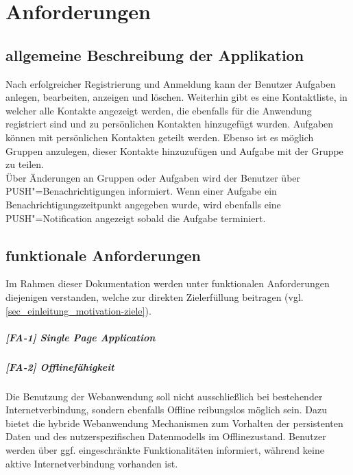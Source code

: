 \chapter{Anforderungen}
\section{allgemeine Beschreibung der Applikation}

Nach erfolgreicher Registrierung und Anmeldung kann der Benutzer Aufgaben anlegen, bearbeiten, anzeigen und löschen. Weiterhin gibt es eine Kontaktliste, in welcher alle Kontakte angezeigt werden, die ebenfalls für die Anwendung registriert sind und zu persönlichen Kontakten hinzugefügt wurden. Aufgaben können mit persönlichen Kontakten geteilt werden. Ebenso ist es möglich Gruppen anzulegen, dieser Kontakte hinzuzufügen und Aufgabe mit der Gruppe zu teilen. \\

Über Änderungen an Gruppen oder Aufgaben wird der Benutzer über PUSH"=Benachrichtigungen informiert. Wenn einer Aufgabe ein Benachrichtigungszeitpunkt angegeben wurde, wird ebenfalls eine PUSH"=Notification angezeigt sobald die Aufgabe terminiert.

\newpage
\section{funktionale Anforderungen}
\label{sec_anforderungen_funktionale-anforderungen}

Im Rahmen dieser Dokumentation werden unter funktionalen Anforderungen diejenigen verstanden, welche zur direkten Zielerfüllung beitragen (vgl. \ref{sec_einleitung_motivation-ziele}).


\paragraph{[FA-1] Single Page Application}\label{fa-1}
\paragraph{[FA-2] Offlinefähigkeit}\label{fa-2} Die Benutzung der Webanwendung soll nicht ausschließlich bei bestehender Internetverbindung, sondern ebenfalls Offline reibungslos möglich sein. Dazu bietet die hybride Webanwendung Mechanismen zum Vorhalten der persistenten Daten und des nutzerspezifischen Datenmodells im Offlinezustand. Benutzer werden über ggf. eingeschränkte Funktionalitäten informiert, während keine aktive Internetverbindung vorhanden ist.

